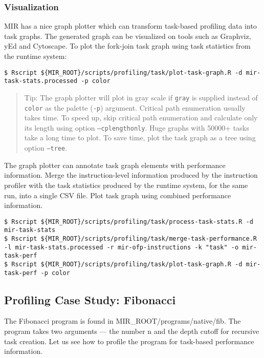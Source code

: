 \documentclass[11pt,a4paper]{article}
\begin{document}
\subsubsection{Visualization}

MIR has a nice graph plotter which can transform task-based profiling data into task graphs. The generated graph can be visualized on tools such as Graphviz, yEd and Cytoscape.  To plot the fork-join task graph using task statistics from the runtime system:

\begin{lstlisting}[style=MyInputStyle]
$ Rscript ${MIR_ROOT}/scripts/profiling/task/plot-task-graph.R -d mir-task-stats.processed -p color
\end{lstlisting}

\begin{framed}
\begin{quote}
Tip: The graph plotter will plot in gray scale if \texttt{gray} is supplied instead of \texttt{color} as the palette (\texttt{-p}) argument. Critical path enumeration usually takes time. To speed up, skip critical path enumeration and calculate only its length using option \texttt{--cplengthonly}. Huge graphs with 50000+ tasks take a long time to plot. To save time, plot the task graph as a tree using option \texttt{--tree}.
\end{quote}
\end{framed}

The graph plotter can annotate task graph elements with performance information. Merge the instruction-level information produced by the instruction profiler with the task statistics produced by the runtime system, for the same run, into a single CSV file. Plot task graph using combined performance information.

\begin{lstlisting}[style=MyInputStyle]
$ Rscript ${MIR_ROOT}/scripts/profiling/task/process-task-stats.R -d mir-task-stats
$ Rscript ${MIR_ROOT}/scripts/profiling/task/merge-task-performance.R -l mir-task-stats.processed -r mir-ofp-instructions -k "task" -o mir-task-perf
$ Rscript ${MIR_ROOT}/scripts/profiling/task/plot-task-graph.R -d mir-task-perf -p color
\end{lstlisting}

\subsection{Profiling Case Study: Fibonacci}

The Fibonacci program is found in MIR\_ROOT/programs/native/fib. The program takes two arguments --- the number n and the depth cutoff for recursive task creation. Let us see how to profile the program for task-based performance information.
\end{document}
